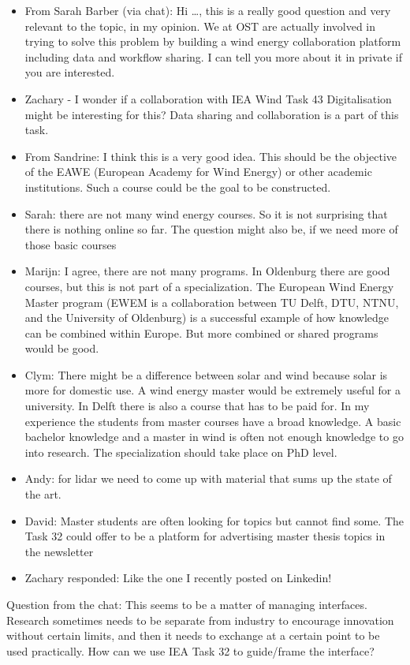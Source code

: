 \begin{itemize}
	\item From Sarah Barber (via chat): Hi \ldots, this is a really good question and very relevant to the topic, in my opinion. We at OST are
 actually involved in trying to solve this problem by building a wind energy collaboration platform including data and workflow sharing. I can tell you more about it in private if you are interested. 
	 \item Zachary - I wonder if a collaboration with IEA Wind Task 43 Digitalisation might be interesting for this? Data sharing and collaboration is a part of this task.
	\item From Sandrine: I think this is a very good idea. This should be the objective of the EAWE (European Academy for Wind Energy) or other academic institutions. Such a course could be the goal to be constructed.
	\item Sarah: there are not many wind energy courses. So it is not surprising that there is nothing online so far. The question might also be, if we need more of those basic courses
	\item Marijn: I agree, there are not many programs. In Oldenburg there are good courses, but this is not part of a specialization. The European Wind Energy Master program (EWEM is a collaboration between TU Delft, DTU, NTNU, and the University of Oldenburg) is a successful example of how knowledge can be combined within Europe. But more combined or shared programs would be good.
	\item Clym: There might be a difference between solar and wind because solar is more for domestic use. A wind energy master would be extremely useful for a university. In Delft there is also a course that has to be paid for. In my experience the students from master courses have a broad knowledge. A basic bachelor knowledge and a master in wind is often not enough knowledge to go into research. The specialization should take place on PhD level.
	\item Andy: for lidar we need to come up with material that sums up the state of the art.
	\item David: Master students are often looking for topics but cannot find some. The Task 32 could offer to be a platform for advertising master thesis topics in the newsletter
	\item Zachary responded: Like the one I recently posted on Linkedin!
\end{itemize}

Question from the chat: This seems to be a matter of managing interfaces. Research sometimes needs to be separate from industry to encourage innovation without certain limits, and then it needs to exchange at a certain point to be used practically. How can we use IEA Task 32 to guide/frame the interface?

